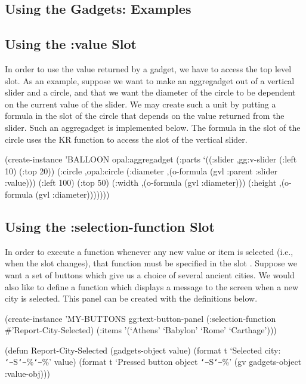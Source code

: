 \begin{group}
\chapter{Using the Gadgets: Examples}
\label{Examples}

\section{Using the :value Slot}
\label{use-value}
In order to use the value returned by a gadget,
we have to access the top level  slot.
As an example, suppose we want to make an aggregadget out of a vertical slider
and a circle, and that we want the diameter of the circle to be dependent on
the current value of the slider.  We may create such a unit by putting
a formula in the  slot of the circle that depends on the value
returned from the slider.
Such an aggregadget is implemented below.
The formula in the  slot of the circle uses the KR function
 to access the  slot of the vertical slider.

\begin{programexample}
(create-instance 'BALLOON opal:aggregadget
   (:parts
    `((:slider ,gg:v-slider
               (:left 10)
               (:top 20))
      (:circle ,opal:circle
               (:diameter ,(o-formula (gvl :parent :slider :value)))
               (:left 100) (:top 50)
               (:width ,(o-formula (gvl :diameter)))
               (:height ,(o-formula (gvl :diameter)))))))
\end{programexample}
\end{group}

\begin{group}
\section{Using the :selection-function Slot}
\label{use-selection}
In order to execute a function whenever any new value or item is selected
(i.e., when the  slot changes), that function must be specified in
the slot .
Suppose we want
a set of buttons which give us a choice of several ancient cities.  We would
also like to define a function which
displays a message to the screen when a new city is selected.  This
panel can be created with the definitions below.

\begin{programexample}
(create-instance 'MY-BUTTONS gg:text-button-panel
    (:selection-function \#'Report-City-Selected)
    (:items '(`Athens' `Babylon' `Rome' `Carthage')))

(defun Report-City-Selected (gadgets-object value)
  (format t `Selected city:  {\tt\char`\~}S{\tt\char`\~}\%{\tt\char`\~}\%' value)
  (format t `Pressed button object {\tt\char`\~}S{\tt\char`\~}\%'
            (gv gadgets-object :value-obj)))
\end{programexample}
\end{group}



